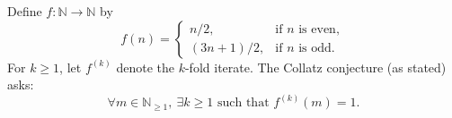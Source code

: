 Define $f:\mathbb{N}\to\mathbb{N}$ by
\[
 f(n)=\begin{cases}
 n/2,&\text{if $n$ is even},\\
 (3n+1)/2,&\text{if $n$ is odd}.
 \end{cases}
\]
For $k\ge 1$, let $f^{(k)}$ denote the $k$-fold iterate.
The Collatz conjecture (as stated) asks:
\[
\forall m\in\mathbb{N}_{\ge 1},\ \exists k\ge 1\text{ such that } f^{(k)}(m)=1.
\]
